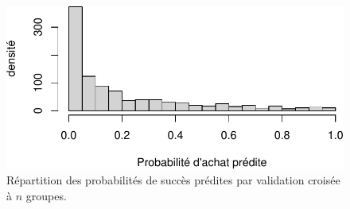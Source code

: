 \documentclass[
  11pt,
  letterpaper,
]{book}
\theoremstyle{definition}
\theoremstyle{remark}
\begin{document}
\begin{figure}[ht!]

{\centering \includegraphics{./05-reglogistique_files/figure-pdf/fig-classification0-1.pdf}

}

\caption{\label{fig-classification0}Répartition des probabilités de
succès prédites par validation croisée à \(n\) groupes.}

\end{figure}
\end{document}
